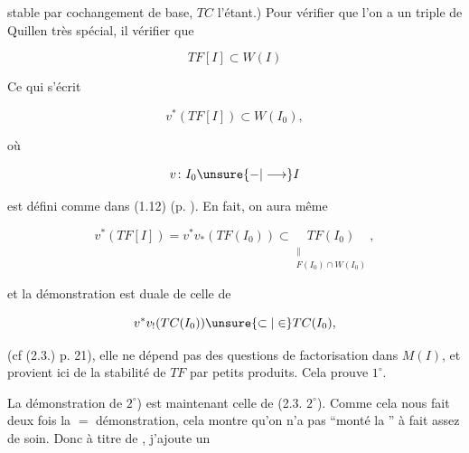 
stable par cochangement de base, $TC$ l'étant.) Pour
vérifier que l'on a un triple de Quillen
très spécial, il  vérifier que

\[
 TF[I]\subset W(I)
\]

Ce qui  s'écrit

\[
 v^*(TF[I])\subset W(I_0),
\]

où

\[
 v\colon I_0\unsure{-|\longrightarrow}I
\]

est défini comme dans (1.12) (p. ). En fait,
on aura même

\[
 v^*(TF[I])=v^*v_*(TF(I_0))\subset
 \underset{\substack{\|\\ F(I_0)\cap W(I_0)}}{TF(I_0)},
\]

et la démonstration est duale de celle de

\[
 v^*v_!(TC(I_0))\unsure{\subset|\in} TC(I_0),
\]

(cf (2.3.) p. 21), elle ne dépend pas des
questions de factorisation dans $M(I)$, et provient
ici de la stabilité de $TF$ par petits
produits. Cela prouve $1^\circ$.

La démonstration de $2^\circ$) est maintenant
 celle de (2.3. $2^\circ$). Comme cela nous fait
 deux fois la $=$ démonstration, cela
montre qu'on n'a pas ``monté la '' 
à fait  assez de soin. Donc à titre
de , j'ajoute un
